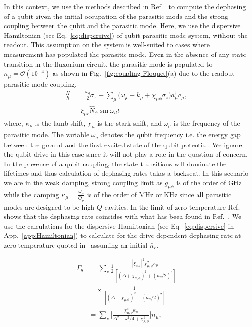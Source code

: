 \documentclass[%
reprint,
superscriptaddress,
 amsmath,amssymb,
 aps,
 prx,
longbibliography,
floatfix,
]{revtex4-2}
\begin{document}
In this context, we use the methods described in Ref.~\cite{clerk2007using} to compute the dephasing of a qubit given the initial occupation of the parasitic mode and the strong coupling between the qubit and the parasitic mode. Here, we use the dispersive Hamiltonian (see Eq.~\ref{eq:dispersive}) of qubit-parasitic mode system, without the readout. This assumption on the system is well-suited to cases where measurement has populated the parasitic mode. Even in the absence of any state transition in the fluxonium circuit, the parasitic mode is populated to $\bar n_\mu=\mathcal{O}(10^{-4})$ as shown in Fig.~\ref{fig:coupling-Floquet}(a) due to the readout-parasitic mode coupling.
\begin{align}
\frac{H}{\hbar}&=\frac{\omega_q}{2}\sigma_z+\sum_{\mu}\Big(\omega_\mu+k_\mu+\chi_{\mu\phi}\sigma_z\Big) a_\mu^\dagger a_\mu,\\
&+\xi_{\mu r}\hat N_\phi\sin{\omega_d t}
\end{align}
where, $\kappa_\mu$ is the lamb shift, $\chi_\mu$ is the stark shift, and $\omega_\mu$ is the frequency of the parasitic mode. The variable $\omega_q$ denotes the qubit frequency i.e. the energy gap between the ground and the first excited state of the qubit potential. We ignore the qubit drive in this case since it will not play a role in the question of concern. In the presence of a qubit coupling, the state transitions will dominate the lifetimes and thus calculation of dephasing rates takes a backseat. In this scenario we are in the weak damping, strong coupling limit as $g_{\mu\phi}$ is of the order of GHz while the damping $\kappa_\mu=\frac{\omega_\mu}{Q_\mu}$ is of the order of MHz or KHz since all parasitic modes are designed to be high $Q$ cavities. In the limit of zero temperature Ref.~\cite{clerk2007using} shows that the dephasing rate coincides with what has been found in Ref.~\cite{gambetta2006qubit}. We use the calculations for the dispersive Hamiltonian (see Eq.~\ref{eq:dispersive} in App.~\ref{app:Hamiltonian}) to calculate for the drive-dependent dephasing rate at zero temperature quoted in~\cite{gambetta2006qubit,clerk2007using} assuming an initial $\bar n_r$.

\begin{align}
    \Gamma_\theta&=\sum_\mu \frac{1}{2}\frac{|\xi_{\mu,r}|^2\chi_{\mu,\phi}^2\kappa_\mu}{[(\Delta+\chi_{\mu,\phi})^2+(\kappa_\mu/2)^2]}\nonumber\\
    &\quad\times\frac{1}{[(\Delta-\chi_{\mu,\phi})^2+(\kappa_\mu/2)^2]}\\
&=\sum_\mu \Big[\frac{\chi_{\mu,\phi}^2\kappa_\mu}{\Delta^2+\kappa^2/4+\chi_{\mu,\phi}^2}\Big]\bar n_\mu,\label{eq:dephasing}
\end{align}
\end{document}
